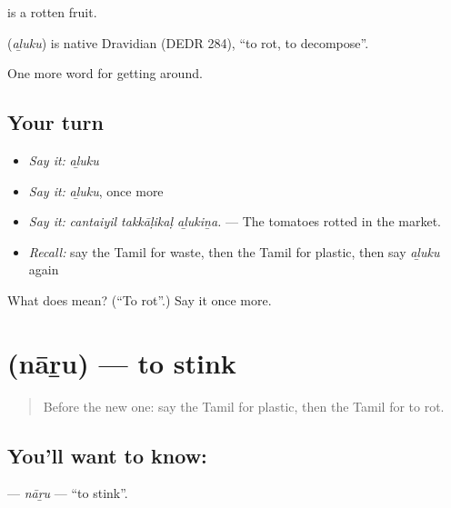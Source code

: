   is a rotten fruit.

\begin{cousinweb}
\textbf{} (\emph{aḻuku}) is native Dravidian (DEDR 284), \textquotedblleft{}to rot, to decompose\textquotedblright{}.
\end{cousinweb}

\begin{grammarlens}[title={What you've built}]
One more word for getting around.
\end{grammarlens}

\subsection*{Your turn}
\begin{itemize}
\raggedright
  \item \emph{Say it:} \emph{aḻuku}
  \item \emph{Say it:} \emph{aḻuku}, once more
  \item \emph{Say it:} \emph{cantaiyil takkāḷikaḷ aḻukiṉa.} — The tomatoes rotted in the market.
  \item \emph{Recall:} say the Tamil for waste, then the Tamil for plastic, then say \emph{aḻuku} again
\end{itemize}

\begin{tcolorbox}[breakable,colback=teal!4,colframe=teal!35!black,title={Before you move on}]
What does  mean? (\textquotedblleft{}To rot\textquotedblright{}.) Say it once more.
\end{tcolorbox}
\section[\texorpdfstring{\ta{நாறு} (nāṟu)}{நாறு (nāṟu)}]{ (nāṟu) — to stink}

\label{lesson:TA-C441-naru}



\begin{quote}
Before the new one: say the Tamil for plastic, then the Tamil for to rot.
\end{quote}

\subsection*{You'll want to know: }
\textbf{} — \emph{nāṟu} — \textquotedblleft{}to stink\textquotedblright{}.

